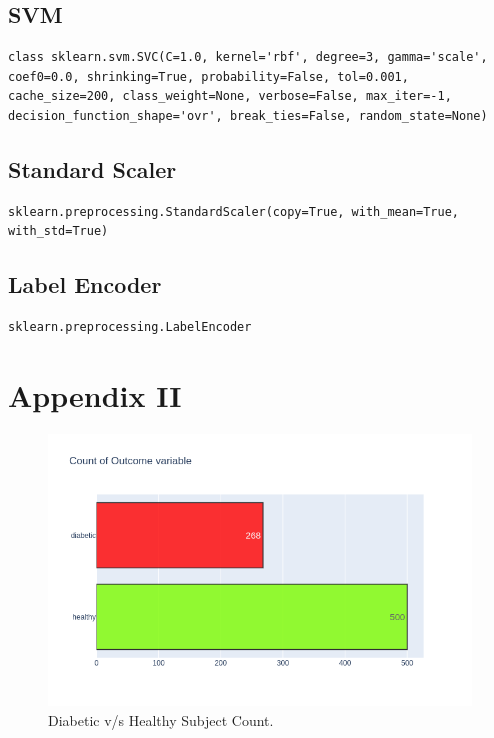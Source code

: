\documentclass[12pt]{article}
\begin{document}
\subsection{SVM}
\begin{lstlisting}
class sklearn.svm.SVC(C=1.0, kernel='rbf', degree=3, gamma='scale', coef0=0.0, shrinking=True, probability=False, tol=0.001, cache_size=200, class_weight=None, verbose=False, max_iter=-1, decision_function_shape='ovr', break_ties=False, random_state=None)
\end{lstlisting}

\subsection{Standard Scaler}
\begin{lstlisting}
sklearn.preprocessing.StandardScaler(copy=True, with_mean=True, with_std=True)
\end{lstlisting}

\subsection{Label Encoder}
\begin{lstlisting}
sklearn.preprocessing.LabelEncoder
\end{lstlisting}

\clearpage
\section{Appendix II}

\begin{figure}[ht]
\centering
\includegraphics[width=1\textwidth]{1.png}
\caption{\label{fig:8} Diabetic v/s Healthy Subject Count.}
\end{figure}
\end{document}
